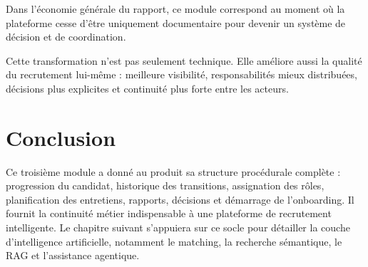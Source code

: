 Dans l'économie générale du rapport, ce module correspond au moment où la plateforme cesse d'être uniquement documentaire pour devenir un système de décision et de coordination.

Cette transformation n'est pas seulement technique. Elle améliore aussi la qualité du recrutement lui-même : meilleure visibilité, responsabilités mieux distribuées, décisions plus explicites et continuité plus forte entre les acteurs.

\section*{Conclusion}
Ce troisième module a donné au produit sa structure procédurale complète : progression du candidat, historique des transitions, assignation des rôles, planification des entretiens, rapports, décisions et démarrage de l'onboarding. Il fournit la continuité métier indispensable à une plateforme de recrutement intelligente. Le chapitre suivant s'appuiera sur ce socle pour détailler la couche d'intelligence artificielle, notamment le matching, la recherche sémantique, le RAG et l'assistance agentique.

